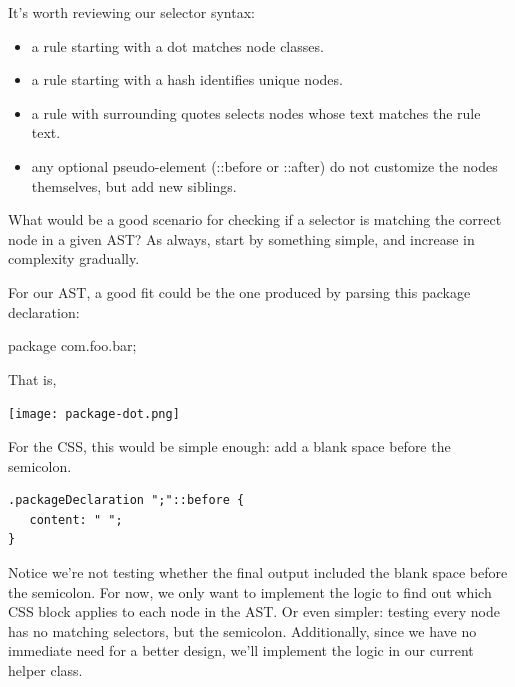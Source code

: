 \documentclass[11pt]{article}
\begin{document}
It's worth reviewing our selector syntax:

\begin{itemize}
\item a rule starting with a dot matches node classes.
\item a rule starting with a hash identifies unique nodes.
\item a rule with surrounding quotes selects nodes whose text matches the rule text.
\item any optional pseudo-element (::before or ::after) do not customize the nodes themselves, but add new siblings.
\end{itemize}

What would be a good scenario for checking if a selector is matching the correct node in a given AST? As always, start by
something simple, and increase in complexity gradually.

For our AST, a good fit could be the one produced by parsing this package declaration:

package com.foo.bar;

That is,

\texttt{[image: package-dot.png]}

For the CSS, this would be simple enough: add a blank space before the semicolon.

\begin{verbatim}
.packageDeclaration ";"::before {
   content: " ";
}
\end{verbatim}

Notice we're not testing whether the final output included the blank space before the semicolon.
For now, we only want to implement the logic to find out which CSS block applies to each node in the AST. Or even simpler:
testing every node has no matching selectors, but the semicolon. Additionally, since we have no immediate need for a better
design, we'll implement the logic in our current helper class.
\end{document}

